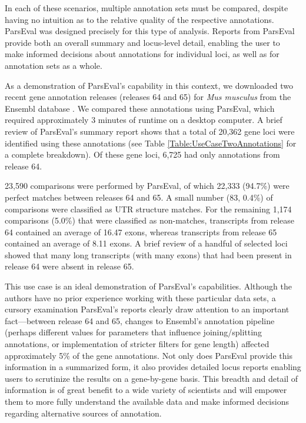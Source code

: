 In each of these scenarios, multiple annotation sets must be compared, despite having no intuition as to the relative quality of the respective annotations.
ParsEval was designed precisely for this type of analysis.
Reports from ParsEval provide both an overall summary and locus-level detail, enabling the user to make informed decisions about annotations for individual loci, as well as for annotation sets as a whole.

As a demonstration of ParsEval's capability in this context, we downloaded two recent gene annotation releases (releases 64 and 65) for \textit{Mus musculus} from the Ensembl database \citep{ensembl}.
We compared these annotations using ParsEval, which required approximately 3 minutes of runtime on a desktop computer.
A brief review of ParsEval's summary report shows that a total of 20,362 gene loci were identified using these annotations (see Table \ref{Table:UseCaseTwoAnnotations} for a complete breakdown).
Of these gene loci, 6,725 had only annotations from release 64.

23,590 comparisons were performed by ParsEval, of which 22,333 (94.7\%) were perfect matches between releases 64 and 65.
A small number (83, 0.4\%) of comparisons were classified as UTR structure matches.
For the remaining 1,174 comparisons (5.0\%) that were classified as non-matches, transcripts from release 64 contained an average of 16.47 exons, whereas transcripts from release 65 contained an average of 8.11 exons.
A brief review of a handful of selected loci showed that many long transcripts (with many exons) that had been present in release 64 were absent in release 65.

This use case is an ideal demonstration of ParsEval's capabilities.
Although the authors have no prior experience working with these particular data sets, a cursory examination ParsEval's reports clearly draw attention to an important fact---between release 64 and 65, changes to Ensembl's annotation pipeline (perhaps different values for parameters that influence joining/splitting annotations, or implementation of stricter filters for gene length) affected approximately 5\% of the gene annotations.
Not only does ParsEval provide this information in a summarized form, it also provides detailed locus reports enabling users to scrutinize the results on a gene-by-gene basis.
This breadth and detail of information is of great benefit to a wide variety of scientists and will empower them to more fully understand the available data and make informed decisions regarding alternative sources of annotation.


